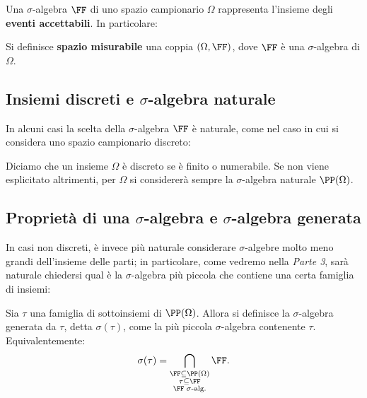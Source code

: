 \begin{multicols*}{2}
    Una $\sigma$-algebra $\FF$ di uno spazio campionario $\Omega$ rappresenta l'insieme degli
    \textbf{eventi accettabili}. In particolare:

    \begin{definition}
        Si definisce \textbf{spazio misurabile} una coppia
        $(\Omega, \FF)$, dove $\FF$ è una $\sigma$-algebra
        di $\Omega$.
    \end{definition}

    \subsection{Insiemi discreti e \texorpdfstring{$\sigma$}{σ}-algebra naturale}

    In alcuni casi la scelta della $\sigma$-algebra $\FF$ è
    naturale, come nel caso in cui si considera uno spazio
    campionario discreto:

    \begin{definition}
        Diciamo che un insieme $\Omega$ è discreto se è finito o numerabile.
        Se non viene esplicitato altrimenti, per $\Omega$ si considererà
        sempre la $\sigma$-algebra naturale $\PP(\Omega)$.
    \end{definition}

    \subsection{Proprietà di una \texorpdfstring{$\sigma$}{σ}-algebra e \texorpdfstring{$\sigma$}{σ}-algebra generata}

    In casi non discreti, è invece più naturale considerare
    $\sigma$-algebre molto meno grandi dell'insieme delle
    parti; in particolare, come vedremo nella \textit{Parte 3},
    sarà naturale chiedersi qual è la $\sigma$-algebra più
    piccola che contiene una certa famiglia di insiemi:

    \begin{definition}
        Sia $\tau$ una famiglia di sottoinsiemi di $\PP(\Omega)$. Allora
        si definisce la $\sigma$-algebra
        generata da $\tau$, detta $\sigma(\tau)$, come la più
        piccola $\sigma$-algebra contenente $\tau$. Equivalentemente:
        \[
            \sigma(\tau) = \bigcap_{\substack{\FF \subseteq \PP(\Omega) \\ \tau \subseteq \FF \\ \FF \; \sigma\text{-alg.}}} \FF.
        \]
    \end{definition}


\end{multicols*}
